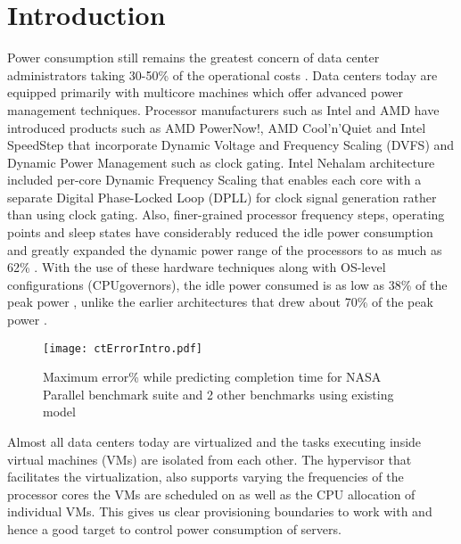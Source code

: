 \documentclass{sig-alternate}
\begin{document}
\section{Introduction}
\label{ch:intro}
Power consumption still remains the greatest concern of data center administrators taking 30-50\% of the operational costs \cite{Qureshi2009}. Data centers today are equipped primarily with multicore machines which offer advanced power management techniques. Processor manufacturers such as Intel and AMD have introduced products such as AMD PowerNow!, AMD Cool'n'Quiet and Intel SpeedStep that incorporate Dynamic Voltage and Frequency Scaling (DVFS) and Dynamic Power Management such as clock gating. Intel Nehalam architecture included per-core Dynamic Frequency Scaling that enables each core with a separate Digital Phase-Locked Loop (DPLL) \cite{Kurd2009} for clock signal generation rather than using clock gating. Also, finer-grained processor frequency steps, operating points and sleep states have considerably reduced the idle power consumption and greatly expanded the dynamic power range of the processors to as much as 62\% \cite{swetechreport}. With the use of these hardware techniques along with OS-level configurations (CPUgovernors), the idle power consumed is as low as 38\% of the peak power \cite{swetechreport}, unlike the earlier architectures that drew about 70\% of the peak power \cite{Fan2007}. 
\begin{figure}[!htbp]
\centering
\texttt{[image: ctErrorIntro.pdf]}
\caption{Maximum error\% while predicting completion time for NASA Parallel benchmark suite and 2 other benchmarks using existing model}
\label{fig:ctErrorIntro}
\end{figure}


Almost all data centers today are virtualized and the tasks executing inside virtual machines (VMs) are isolated from each other. The hypervisor that facilitates the virtualization, also supports varying the frequencies of the processor cores the VMs are scheduled on as well as the CPU allocation of individual VMs. This gives us clear provisioning boundaries to work with and hence a good target to control power consumption of servers.
\end{document}
